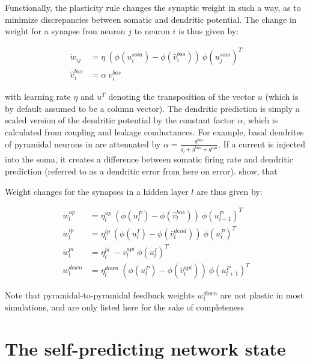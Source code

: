 Functionally, the plasticity rule changes the synaptic weight in such a way, as to minimize discrepancies between
somatic and dendritic potential. The change in weight for a synapse fron neuron $j$ to neuron $i$ is thus given by:

\begin{align}
  \dot{w}_{ij}    & = \eta \ ( \phi(u_i^{som}) - \phi(\hat{v}_i^{bas}) ) \ \phi(u_j^{som})^T \\
  \hat{v}_i^{bas} & = \alpha \  v_i^{bas}
\end{align}

with learning rate $\eta$ and $u^T$ denoting the transposition of the vector $u$ (which is by default assumed to be a
column vector). The dendritic prediction is simply a scaled version of the dendritic potential by the constant factor
$\alpha$, which is calculated from coupling and leakage conductances. For example, basal dendrites of pyramidal neurons
in \cite{sacramento2018dendritic} are attenuated by $\alpha = \frac{g^{bas}}{g_l + g^{bas} + g^{api}}$. If a current is
injected into the soma, it creates a difference between somatic firing rate and dendritic prediction (referred to as a
dendritic error from here on error). \cite{urbanczik2014learning} show, that 





Weight changes for the synapses in a hidden layer $l$ are thus given by:

\begin{align}
  \dot{w}_{l}^{up}   & = \eta_l^{up} \ ( \phi(u_l^{P}) - \phi(\hat{v}_l^{bas}) ) \ \phi(u_{l-1}^{P})^T                     \\
  \dot{w}_{l}^{ip}   & = \eta_l^{ip} \ ( \phi(u_l^{I}) - \phi(\hat{v}_l^{dend}) ) \ \phi(u_{l}^{P})^T\label{eq-delta_w_ip} \\
  \dot{w}_{l}^{pi}   & = \eta_l^{pi} \ - v_l^{api} \ \phi(u_l^{I})^T\label{eq-delta_w_pi}                                  \\
  \dot{w}_{l}^{down} & = \eta_l^{down} \ ( \phi(u_l^{P}) - \phi(\hat{v}_l^{api}) )\ \phi(u_{l+1}^{P})^T
\end{align}

Note that pyramidal-to-pyramidal feedback weights $w_l^{down}$ are not plastic in most simulations, and are only listed
here for the sake of completeness 




\section{The self-predicting network state}

